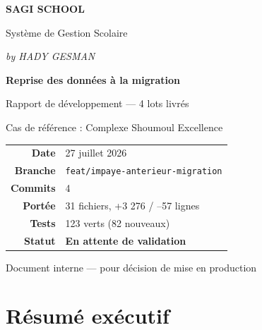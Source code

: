 \documentclass[11pt,a4paper]{report}
\begin{document}
\begin{titlepage}
\centering
\vspace*{2.5cm}
{\Huge\bfseries\color{sagiteal} SAGI SCHOOL\par}
\vspace{0.4cm}
{\Large\color{sagidark} Système de Gestion Scolaire\par}
\vspace{0.2cm}
{\large\color{sagigray} \textit{by HADY GESMAN}\par}
\vspace{2.2cm}
{\LARGE\bfseries\color{sagidark} Reprise des données à la migration\par}
\vspace{0.5cm}
{\large\color{sagigray} Rapport de développement --- 4 lots livrés\par}
\vspace{0.3cm}
{\normalsize\color{sagigray} Cas de référence : Complexe Shoumoul Excellence\par}
\vspace{2.6cm}

\begin{tabular}{rl}
\textbf{Date} & 27 juillet 2026\\[4pt]
\textbf{Branche} & \texttt{feat/impaye-anterieur-migration}\\[4pt]
\textbf{Commits} & 4\\[4pt]
\textbf{Portée} & 31 fichiers, +3 276 / --57 lignes\\[4pt]
\textbf{Tests} & 123 verts (82 nouveaux)\\[4pt]
\textbf{Statut} & \textbf{\color{sagiamber}En attente de validation}\\[4pt]
\end{tabular}

\vfill
{\small\color{sagigray} Document interne --- pour décision de mise en production\par}
\end{titlepage}

{\small
\setcounter{tocdepth}{1}
\tableofcontents
}
\newpage

\chapter*{Résumé exécutif}
\end{document}

